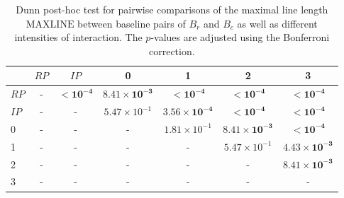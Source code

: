 \begin{table}
\centering
\caption{Dunn post-hoc test for pairwise comparisons of the maximal line length $\text{MAXLINE}$  between baseline pairs of $B_r$ and $B_c$ as well as different intensities of interaction. The $p$-values are adjusted using the Bonferroni correction.}
\label{tab:dunn_maxline}
\begin{tabular}{lcccccc}
\toprule
 & $RP$ & $IP$ & 0 & 1 & 2 & 3 \\
\midrule
$RP$ & - & $\mathbf{< 10^{-4}}$ & $\mathbf{8.41 \times 10^{-3}}$ & $\mathbf{< 10^{-4}}$ & $\mathbf{< 10^{-4}}$ & $\mathbf{< 10^{-4}}$ \\
$IP$ & - & - & $5.47 \times 10^{-1}$ & $\mathbf{3.56 \times 10^{-4}}$ & $\mathbf{< 10^{-4}}$ & $\mathbf{< 10^{-4}}$ \\
0 & - & - & - & $1.81 \times 10^{-1}$ & $\mathbf{8.41 \times 10^{-3}}$ & $\mathbf{< 10^{-4}}$ \\
1 & - & - & - & - & $5.47 \times 10^{-1}$ & $\mathbf{4.43 \times 10^{-3}}$ \\
2 & - & - & - & - & - & $\mathbf{8.41 \times 10^{-3}}$ \\
3 & - & - & - & - & - & - \\
\bottomrule
\end{tabular}
\end{table}
